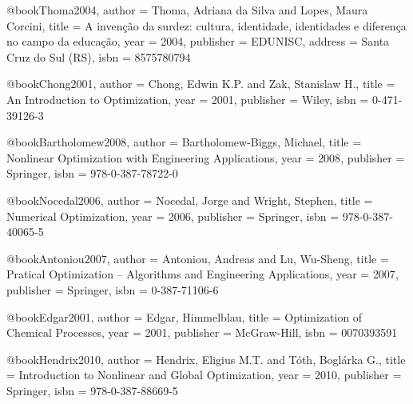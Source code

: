 @book{Thoma2004,
  author = {Thoma, Adriana da Silva and Lopes, Maura Corcini},
  title = {A invenção da surdez: cultura, identidade, identidades e diferença no campo da educação},
  year = {2004},
  publisher = {EDUNISC},
  address = {Santa Cruz do Sul (RS)},
  isbn = {8575780794}
}

%

@book{Chong2001,
  author = {Chong, Edwin K.P. and Zak, Stanislaw H.},
  title = {An Introduction to Optimization},
  year = {2001},
  publisher = {Wiley},
  isbn = {0-471-39126-3}
}

@book{Bartholomew2008,
  author = {Bartholomew-Biggs, Michael},
  title = {Nonlinear Optimization with Engineering Applications},
  year = {2008},
  publisher = {Springer},
  isbn = {978-0-387-78722-0}
}

@book{Nocedal2006,
  author = {Nocedal, Jorge and Wright, Stephen},
  title = {Numerical Optimization},
  year = {2006},
  publisher = {Springer},
  isbn = {978-0-387-40065-5}
}

@book{Antoniou2007,
  author = {Antoniou, Andreas and Lu, Wu-Sheng},
  title = {Pratical Optimization -- Algorithms and Engineering Applications},
  year = {2007},
  publisher = {Springer},
  isbn = {0-387-71106-6}
}

@book{Edgar2001,
  author = {Edgar, Himmelblau},
  title = {Optimization of Chemical Processes},
  year = {2001},
  publisher = {McGraw-Hill},
  isbn = {0070393591}
}

@book{Hendrix2010,
  author = {Hendrix, Eligius M.T. and Tóth, Boglárka G.},
  title = {Introduction to Nonlinear and Global Optimization},
  year = {2010},
  publisher = {Springer},
  isbn = {978-0-387-88669-5}
}

